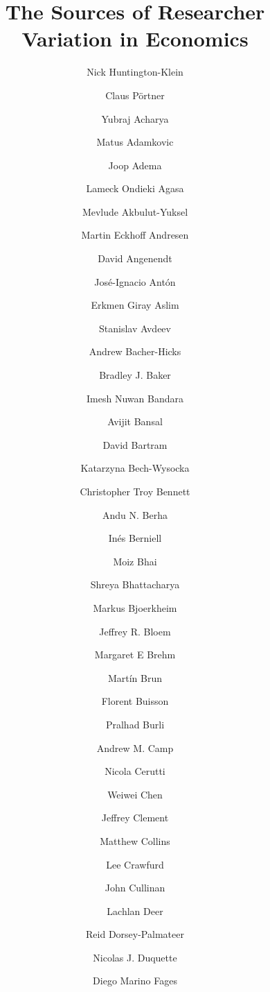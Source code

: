 \documentclass[
  number]{elsarticle}
\begin{document}
\begin{frontmatter}
\title{The Sources of Researcher Variation in Economics}
\author[1]{Nick Huntington-Klein%
%
}
\author[1]{Claus Pörtner%
%
}
\author[2]{Yubraj Acharya%
%
}
\author[3,4,5]{Matus Adamkovic%
%
}
\author[6]{Joop Adema%
%
}
\author[7]{Lameck Ondieki Agasa%
%
}
\author[8]{Mevlude Akbulut-Yuksel%
%
}
\author[9]{Martin Eckhoff Andresen%
%
}
\author[10,11]{David Angenendt%
%
}
\author[12]{José-Ignacio Antón%
%
}
\author[13]{Erkmen Giray Aslim%
%
}
\author[14]{Stanislav Avdeev%
%
}
\author[15]{Andrew Bacher-Hicks%
%
}
\author[16]{Bradley J. Baker%
%
}
\author[17]{Imesh Nuwan Bandara%
%
}
\author[18]{Avijit Bansal%
%
}
\author[19]{David Bartram%
%
}
\author[20,21]{Katarzyna Bech-Wysocka%
%
}
\author[22]{Christopher Troy Bennett%
%
}
\author[23]{Andu N. Berha%
%
}
\author[24,25,26]{Inés Berniell%
%
}
\author[27,28]{Moiz Bhai%
%
}
\author[29]{Shreya Bhattacharya%
%
}
\author[30]{Markus Bjoerkheim%
%
}
\author[31]{Jeffrey R. Bloem%
%
}
\author[32]{Margaret E Brehm%
%
}
\author[33]{Martín Brun%
%
}
\author[34]{Florent Buisson%
%
}
\author[35]{Pralhad Burli%
%
}
\author[36]{Andrew M. Camp%
%
}
\author[37]{Nicola Cerutti%
%
}
\author[38]{Weiwei Chen%
%
}
\author[39]{Jeffrey Clement%
%
}
\author[40]{Matthew Collins%
%
}
\author[41]{Lee Crawfurd%
%
}
\author[42]{John Cullinan%
%
}
\author[43]{Lachlan Deer%
%
}
\author[44]{Reid Dorsey-Palmateer%
%
}
\author[45]{Nicolas J. Duquette%
%
}
\author[46]{Diego Marino Fages%
}
\end{frontmatter}
\end{document}
